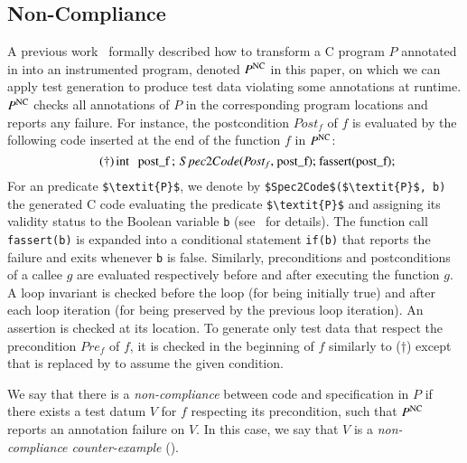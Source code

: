\subsection{Non-Compliance}
\label{subsec:NC}


A previous work~\cite{Petiot/SCAM14} formally described 
how to transform a C program $P$ annotated in \eacsl
into an instrumented program, denoted  $P^\mathrm{NC}$ in this paper,
on which we can apply test generation to produce test data
violating some annotations at runtime.
$P^\mathrm{NC}$ checks all annotations of $P$
in the corresponding program locations
and reports any failure.
For instance, the postcondition $\textit{Post}_f$ of $f$
is evaluated by the following code inserted at the end of the function $f$ in $P^\mathrm{NC}$:
\begin{equation}\tag{$\dagger$}
\mbox{\lstinline[mathescape]'int post_f;  $\ Spec2Code$($\textit{Post}_f$, post_f); fassert(post_f);'}
\end{equation}
For an \eacsl predicate \lstinline[mathescape]'$\textit{P}$',
we denote by \lstinline[mathescape]'$Spec2Code$($\textit{P}$, b)'
the generated C code  evaluating the predicate
\lstinline[mathescape]'$\textit{P}$'
and assigning its validity status to the Boolean 
variable \lstinline[mathescape]'b' (see~\cite{Petiot/SCAM14} for details).
The function call \lstinline[mathescape]'fassert(b)'
is expanded into a conditional
statement \lstinline[mathescape]'if(b)' that reports the failure and exits 
whenever \lstinline[mathescape]'b' is false.
Similarly, preconditions and postconditions of a callee $g$
are evaluated respectively before and after executing the function $g$.
A loop invariant is checked before the loop (for being initially true) 
and after each loop iteration (for being preserved by the previous
loop iteration). 
An assertion is checked at its location.
To generate only test data  that respect
the precondition $\textit{Pre}_f$ of $f$,
it is checked  in the beginning of $f$ 
similarly to ($\dagger$)
except that \fassert
is replaced by \fassume
to assume the given condition.

\vspace{-2mm}
\begin{definition} 
\label{def:NC}
We say that there is a \emph{non-compliance} between code and specification in $P$
if there exists  a test datum $V$ for $f$ respecting its precondition,
such that $P^{\mathrm{NC}}$ reports an annotation failure on $V$.
In this case, we say that $V$ is a \emph{non-compliance counter-example} (\NCCE).
\end{definition}
\vspace{-2mm}

